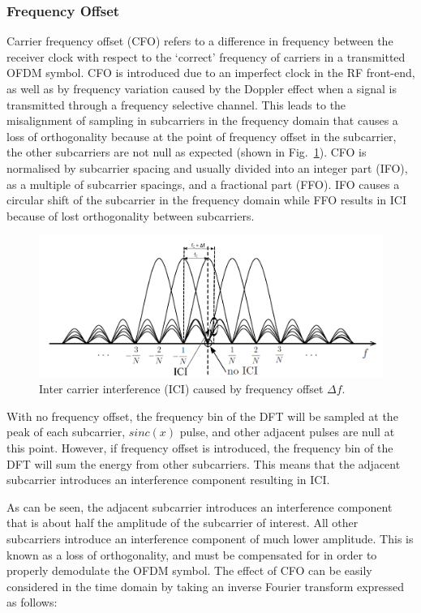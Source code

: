 \subsubsection{Frequency Offset}

Carrier frequency offset (CFO) refers to a difference in frequency between the receiver clock with respect to the `correct' frequency of carriers in a transmitted OFDM symbol.
CFO is introduced due to an imperfect clock in the RF front-end, as well as by frequency variation caused by the Doppler effect when a signal is transmitted through a frequency selective channel.
This leads to the misalignment of sampling in subcarriers in the frequency domain that causes a loss of orthogonality because at the point of frequency offset in the subcarrier, the other subcarriers are not null as expected (shown in Fig.~\ref{fig:OFDM-subcarrier-freoff}).
CFO is normalised by subcarrier spacing and usually divided into an integer part (IFO), as a multiple of subcarrier spacings, and a fractional part (FFO).
IFO causes a circular shift of the subcarrier in the frequency domain while FFO results in ICI because of lost orthogonality between subcarriers.

\begin{figure}
	\centerline{\includegraphics [width=0.8\columnwidth] {Figures/OFDM-subcarrier-freoff.pdf} }
	\caption{Inter carrier interference (ICI) caused by frequency offset $\Delta f$.}
	\label{fig:OFDM-subcarrier-freoff}
\end{figure}

With no frequency offset, the frequency bin of the DFT will be sampled at  the peak of each subcarrier, $sinc(x)$ pulse, and other adjacent pulses are null at this point.
However, if frequency offset is introduced, the frequency bin of the DFT will sum the energy from other subcarriers.
This means that the adjacent subcarrier introduces an interference component resulting in ICI.

As can be seen, the adjacent subcarrier introduces an interference component that is about half the amplitude of the subcarrier of interest.
All other subcarriers introduce an interference component of much lower amplitude.
This is known as a loss of orthogonality, and must be compensated for in order to properly demodulate the OFDM symbol.
The effect of CFO can be easily considered in the time domain by taking an inverse Fourier transform expressed as follows:

